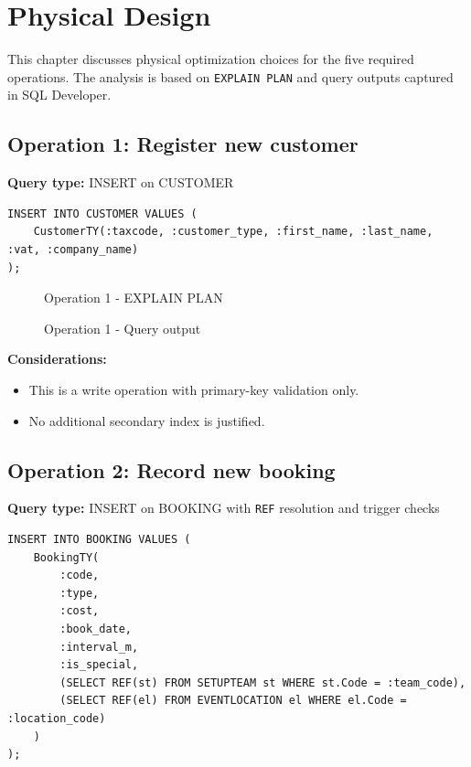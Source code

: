 \chapter{Physical Design}

This chapter discusses physical optimization choices for the five required operations.
The analysis is based on \texttt{EXPLAIN PLAN} and query outputs captured in SQL Developer.
\section{Operation 1: Register new customer}

\textbf{Query type:} INSERT on CUSTOMER

\begin{lstlisting}
INSERT INTO CUSTOMER VALUES (
    CustomerTY(:taxcode, :customer_type, :first_name, :last_name, :vat, :company_name)
);
\end{lstlisting}

\begin{figure}[H]
    \centering
    \caption{Operation 1 - EXPLAIN PLAN}
\end{figure}

\begin{figure}[H]
    \centering
    \caption{Operation 1 - Query output}
\end{figure}

\textbf{Considerations:}
\begin{itemize}
    \item This is a write operation with primary-key validation only.
    \item No additional secondary index is justified.
\end{itemize}

\section{Operation 2: Record new booking}

\textbf{Query type:} INSERT on BOOKING with \texttt{REF} resolution and trigger checks

\begin{lstlisting}
INSERT INTO BOOKING VALUES (
    BookingTY(
        :code,
        :type,
        :cost,
        :book_date,
        :interval_m,
        :is_special,
        (SELECT REF(st) FROM SETUPTEAM st WHERE st.Code = :team_code),
        (SELECT REF(el) FROM EVENTLOCATION el WHERE el.Code = :location_code)
    )
);
\end{lstlisting}

